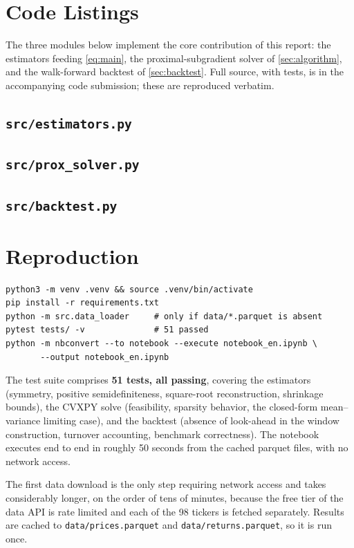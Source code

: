 \section{Code Listings}\label{app:code}

The three modules below implement the core contribution of this report: the estimators feeding
\cref{eq:main}, the proximal-subgradient solver of \cref{sec:algorithm}, and the walk-forward
backtest of \cref{sec:backtest}. Full source, with tests, is in the accompanying code submission;
these are reproduced verbatim.

\subsection{\texttt{src/estimators.py}}


\subsection{\texttt{src/prox\_solver.py}}


\subsection{\texttt{src/backtest.py}}


\section{Reproduction}\label{app:repro}

\begin{lstlisting}[language={}, basicstyle=\ttfamily\small, numbers=none, frame=single]
python3 -m venv .venv && source .venv/bin/activate
pip install -r requirements.txt
python -m src.data_loader     # only if data/*.parquet is absent
pytest tests/ -v              # 51 passed
python -m nbconvert --to notebook --execute notebook_en.ipynb \
       --output notebook_en.ipynb
\end{lstlisting}

The test suite comprises \textbf{51 tests, all passing}, covering the estimators (symmetry,
positive semidefiniteness, square-root reconstruction, shrinkage bounds), the CVXPY solve
(feasibility, sparsity behavior, the closed-form mean--variance limiting case), and the
backtest (absence of look-ahead in the window construction, turnover accounting, benchmark
correctness). The notebook executes end to end in roughly 50 seconds from the cached parquet
files, with no network access.

The first data download is the only step requiring network access and takes considerably
longer, on the order of tens of minutes, because the free tier of the data API is rate limited
and each of the 98 tickers is fetched separately. Results are cached to
\texttt{data/prices.parquet} and \texttt{data/returns.parquet}, so it is run once.
